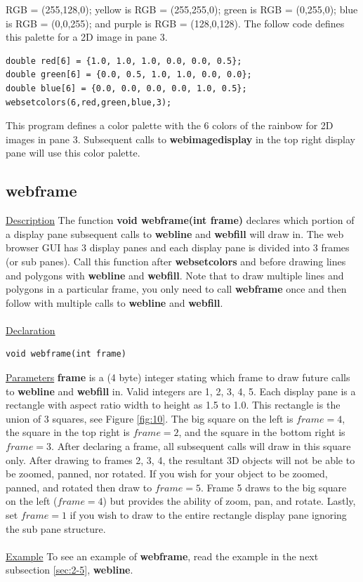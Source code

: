 RGB = (255,128,0); yellow is RGB = (255,255,0); green is RGB = (0,255,0); blue is RGB = (0,0,255); and purple
is RGB = (128,0,128). The follow code defines this palette for a 2D image in pane 3.
\begin{verbatim}
double red[6] = {1.0, 1.0, 1.0, 0.0, 0.0, 0.5};
double green[6] = {0.0, 0.5, 1.0, 1.0, 0.0, 0.0};
double blue[6] = {0.0, 0.0, 0.0, 0.0, 1.0, 0.5};
websetcolors(6,red,green,blue,3); 
\end{verbatim}
This program defines a color palette with the 6 colors of the rainbow for 2D images in pane 3. Subsequent calls to 
\textbf{webimagedisplay} in the top right display pane will use this color palette.

\newpage
\subsection{webframe}
\label{sec:2-12}
\underline{Description} The function \textbf{void webframe(int frame)} declares which portion of a display pane subsequent 
calls to \textbf{webline} and \textbf{webfill} will draw in. The web browser GUI has 3 display panes and each display pane is divided
into 3 frames (or sub panes). Call this function after \textbf{websetcolors} and before drawing lines and polygons with \textbf{webline} 
and \textbf{webfill}. Note that to draw multiple lines and polygons in a particular frame, you only need to call \textbf{webframe} once and 
then follow with multiple calls to \textbf{webline} and \textbf{webfill}.\\
\\
\underline{Declaration}
\begin{verbatim}
void webframe(int frame)
\end{verbatim}
\underline{Parameters} \textbf{frame} is a (4 byte) integer stating which frame to draw future calls to \textbf{webline} and \textbf{webfill} in.
Valid integers are 1, 2, 3, 4, 5. Each display pane is a rectangle with aspect ratio width to height as 1.5 to 1.0. This rectangle is the 
union of 3 squares, see Figure \ref{fig:10}. The big square on the left is $frame = 4$, the square in the top right is $frame = 2$, and the square
in the bottom right is $frame = 3$. After declaring a frame, all subsequent calls will draw in this square only. After drawing to frames 2, 3, 4,
the resultant 3D objects will not be able to be zoomed, panned, nor rotated. If you wish for your object to be zoomed, panned, and rotated
then draw to $frame = 5$. Frame 5 draws to the big square on the left ($frame=4$) but provides the ability of zoom, pan, and rotate. Lastly,
set $frame=1$ if you wish to draw to the entire rectangle display pane ignoring the sub pane structure.\\
\\
\underline{Example} To see an example of \textbf{webframe}, read the example in the next subsection \ref{sec:2-5}, \textbf{webline}.

